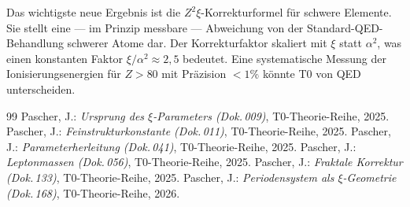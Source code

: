 Das wichtigste neue Ergebnis ist die $Z^2\xi$-Korrekturformel für schwere
Elemente. Sie stellt eine — im Prinzip messbare — Abweichung von der
Standard-QED-Behandlung schwerer Atome dar. Der Korrekturfaktor skaliert
mit $\xi$ statt $\alpha^2$, was einen konstanten Faktor $\xi/\alpha^2 \approx 2{,}5$
bedeutet. Eine systematische Messung der Ionisierungsenergien für
$Z > 80$ mit Präzision $<1\%$ könnte T0 von QED unterscheiden.

\begin{thebibliography}{99}
 Pascher, J.: \emph{Ursprung des $\xi$-Parameters (Dok.\,009)},
  T0-Theorie-Reihe, 2025.
 Pascher, J.: \emph{Feinstrukturkonstante (Dok.\,011)},
  T0-Theorie-Reihe, 2025.
 Pascher, J.: \emph{Parameterherleitung (Dok.\,041)},
  T0-Theorie-Reihe, 2025.
 Pascher, J.: \emph{Leptonmassen (Dok.\,056)},
  T0-Theorie-Reihe, 2025.
 Pascher, J.: \emph{Fraktale Korrektur (Dok.\,133)},
  T0-Theorie-Reihe, 2025.
 Pascher, J.: \emph{Periodensystem als $\xi$-Geometrie (Dok.\,168)},
  T0-Theorie-Reihe, 2026.
\end{thebibliography}
